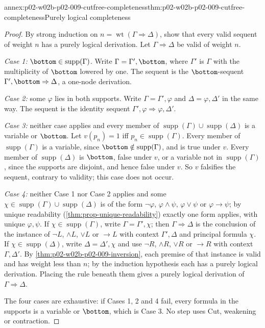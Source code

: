 \begin{annexitem}{annex:p02-w02b-p02-009-cutfree-completeness}{thm:p02-w02b-p02-009-cutfree-completeness}{Purely logical completeness}
\begin{proof}
By strong induction on \(n=\operatorname{wt}(\Gamma\Rightarrow\Delta)\), show
that every valid sequent of weight \(n\) has a purely logical derivation.
Let \(\Gamma\Rightarrow\Delta\) be valid of weight \(n\).

\emph{Case 1:} \(\bottom\in\operatorname{supp}(\Gamma)\).  Write
\(\Gamma=\Gamma',\bottom\), where \(\Gamma'\) is \(\Gamma\) with the
multiplicity of \(\bottom\) lowered by one.  The sequent is the
\(\bottom\)-sequent \(\Gamma',\bottom\Rightarrow\Delta\), a one-node
derivation.

\emph{Case 2:} some \(\varphi\) lies in both supports.  Write
\(\Gamma=\Gamma',\varphi\) and \(\Delta=\varphi,\Delta'\) in the same way.
The sequent is the identity sequent
\(\Gamma',\varphi\Rightarrow\varphi,\Delta'\).

\emph{Case 3:} neither case applies and every member of
\(\operatorname{supp}(\Gamma)\cup\operatorname{supp}(\Delta)\) is a variable
or \(\bottom\).  Let \(v(p_n)=1\) iff \(p_n\in\operatorname{supp}(\Gamma)\).
Every member of \(\operatorname{supp}(\Gamma)\) is a variable, since
\(\bottom\notin\operatorname{supp}(\Gamma)\), and is true under \(v\).  Every
member of \(\operatorname{supp}(\Delta)\) is \(\bottom\), false under \(v\),
or a variable not in \(\operatorname{supp}(\Gamma)\), since the supports are
disjoint, and hence false under \(v\).  So \(v\) falsifies the sequent,
contrary to validity; this case does not occur.

\emph{Case 4:} neither Case 1 nor Case 2 applies and some
\(\chi\in\operatorname{supp}(\Gamma)\cup\operatorname{supp}(\Delta)\) is of
the form \(\neg\varphi\), \(\varphi\land\psi\), \(\varphi\lor\psi\) or
\(\varphi\to\psi\); by unique readability
(\cref{thm:prop-unique-readability}) exactly one form applies, with unique
\(\varphi,\psi\).  If \(\chi\in\operatorname{supp}(\Gamma)\), write
\(\Gamma=\Gamma',\chi\); then \(\Gamma\Rightarrow\Delta\) is the conclusion of
the instance of \(\neg L\), \(\land L\), \(\lor L\) or \(\to L\) with context
\(\Gamma',\Delta\) and principal formula \(\chi\).  If
\(\chi\in\operatorname{supp}(\Delta)\), write \(\Delta=\Delta',\chi\) and use
\(\neg R\), \(\land R\), \(\lor R\) or \(\to R\) with context
\(\Gamma,\Delta'\).  By \cref{thm:p02-w02b-p02-009-inversion}, each premise of
that instance is valid and has weight less than \(n\); by the induction
hypothesis each has a purely logical derivation.  Placing the rule beneath
them gives a purely logical derivation of \(\Gamma\Rightarrow\Delta\).

The four cases are exhaustive: if Cases 1, 2 and 4 fail, every formula in the
supports is a variable or \(\bottom\), which is Case 3.  No step uses Cut,
weakening or contraction.
\end{proof}
\end{annexitem}

